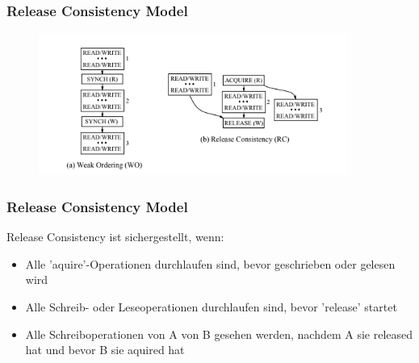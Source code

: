 \documentclass{sikslides}
\begin{document}
\begin{frame}
	\frametitle{Release Consistency Model}
\begin{figure}[htbp] 
  \centering
  \includegraphics[width=0.9\textwidth]{figures/compare.png}
  \label{Fig:weak}
\end{figure}

\end{frame}





\begin{frame}
	\frametitle{Release Consistency Model}
Release Consistency ist sichergestellt, wenn:
	\begin{itemize}
\bigskip
		
		\item Alle 'aquire'-Operationen durchlaufen sind, bevor geschrieben oder gelesen wird \bigskip
		\item Alle Schreib- oder Leseoperationen durchlaufen sind, bevor 'release' startet \bigskip
		\item Alle Schreiboperationen von A von B gesehen werden, nachdem A sie released hat und bevor B sie aquired hat 

	\end{itemize}


\end{frame}
\end{document}
